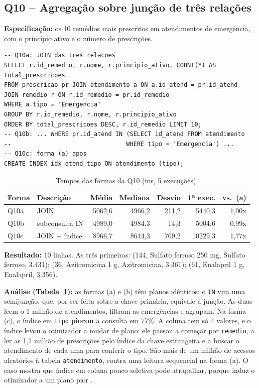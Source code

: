 \documentclass[10pt,a4paper]{article}
\begin{document}
\subsection{Q10 -- Agregação sobre junção de três relações}
\textbf{Especificação:} os 10 remédios mais prescritos em atendimentos de emergência, com o princípio ativo e o número de prescrições.

\begin{lstlisting}
-- Q10a: JOIN das tres relacoes
SELECT r.id_remedio, r.nome, r.principio_ativo, COUNT(*) AS total_prescricoes
FROM prescricao pr JOIN atendimento a ON a.id_atend = pr.id_atend
JOIN remedio r ON r.id_remedio = pr.id_remedio
WHERE a.tipo = 'Emergencia'
GROUP BY r.id_remedio, r.nome, r.principio_ativo
ORDER BY total_prescricoes DESC, r.id_remedio LIMIT 10;
-- Q10b: ... WHERE pr.id_atend IN (SELECT id_atend FROM atendimento
--                                WHERE tipo = 'Emergencia') ...
-- Q10c: forma (a) apos
CREATE INDEX idx_atend_tipo ON atendimento (tipo);
\end{lstlisting}

\begin{table}[H]\centering\footnotesize
\caption{Tempos das formas da Q10 (ms, 5 execuções).}\label{tab:q10}
\begin{tabular}{llrrrrr}\toprule
Forma & Descrição & Média & Mediana & Desvio & 1ª exec. & vs.\ (a) \\ \midrule
Q10a & JOIN             & 5062,6 & 4966,2 & 211,2 &  5440,3 & 1,00x \\
Q10b & subconsulta IN   & 4989,0 & 4984,3 &  14,3 &  5004,6 & 0,99x \\
Q10c & JOIN + índice    & 8966,7 & 8644,3 & 709,2 & 10229,3 & 1,77x \\ \bottomrule
\end{tabular}
\end{table}

\textbf{Resultado:} 10 linhas. As três primeiras: (144, Sulfato ferroso 250 mg, Sulfato ferroso, 3.431); (36, Azitromicina 1 g, Azitromicina, 3.361); (61, Enalapril 1 g, Enalapril, 3.356).

\textbf{Análise (Tabela~\ref{tab:q10}):} as formas (a) e (b) têm planos idênticos: o \texttt{IN} vira uma semijunção, que, por ser feita sobre a chave primária, equivale à junção. As duas leem o 1 milhão de atendimentos, filtram as emergências e agrupam. Na forma (c), o índice em \texttt{tipo} \textbf{piorou} a consulta em 77\%. A coluna tem só 4 valores, e o índice levou o otimizador a mudar de plano: ele passou a começar por \texttt{remedio}, a ler as 1,1 milhão de prescrições pelo índice da chave estrangeira e a buscar o atendimento de cada uma para conferir o tipo. São mais de um milhão de acessos aleatórios à tabela \texttt{atendimento}, contra uma leitura sequencial na forma (a). O caso mostra que índice em coluna pouco seletiva pode atrapalhar, porque induz o otimizador a um plano pior \cite{elmasri,mysql-indexes}.
\end{document}
